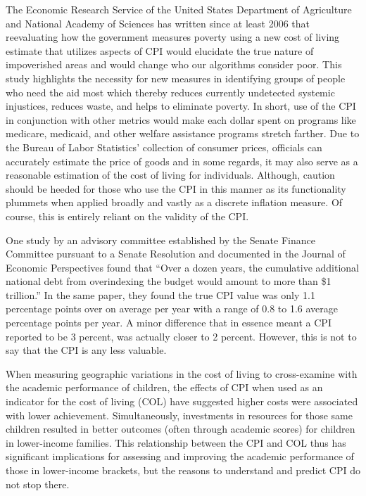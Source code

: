 \documentclass[
]{article}
\begin{document}
The Economic Research Service of the United States Department of
Agriculture and National Academy of Sciences has written since at least
2006 that reevaluating how the government measures poverty using a new
cost of living estimate that utilizes aspects of CPI would elucidate the
true nature of impoverished areas and would change who our algorithms
consider poor. This study highlights the necessity for new measures in
identifying groups of people who need the aid most which thereby reduces
currently undetected systemic injustices, reduces waste, and helps to
eliminate poverty. In short, use of the CPI in conjunction with other
metrics would make each dollar spent on programs like medicare,
medicaid, and other welfare assistance programs stretch farther. Due to
the Bureau of Labor Statistics' collection of consumer prices, officials
can accurately estimate the price of goods and in some regards, it may
also serve as a reasonable estimation of the cost of living for
individuals. Although, caution should be heeded for those who use the
CPI in this manner as its functionality plummets when applied broadly
and vastly as a discrete inflation measure. Of course, this is entirely
reliant on the validity of the CPI.

One study by an advisory committee established by the Senate Finance
Committee pursuant to a Senate Resolution and documented in the Journal
of Economic Perspectives found that ``Over a dozen years, the cumulative
additional national debt from overindexing the budget would amount to
more than \$1 trillion.'' In the same paper, they found the true CPI
value was only 1.1 percentage points over on average per year with a
range of 0.8 to 1.6 average percentage points per year. A minor
difference that in essence meant a CPI reported to be 3 percent, was
actually closer to 2 percent. However, this is not to say that the CPI
is any less valuable.

When measuring geographic variations in the cost of living to
cross-examine with the academic performance of children, the effects of
CPI when used as an indicator for the cost of living (COL) have
suggested higher costs were associated with lower achievement.
Simultaneously, investments in resources for those same children
resulted in better outcomes (often through academic scores) for children
in lower-income families. This relationship between the CPI and COL thus
has significant implications for assessing and improving the academic
performance of those in lower-income brackets, but the reasons to
understand and predict CPI do not stop there.
\end{document}
